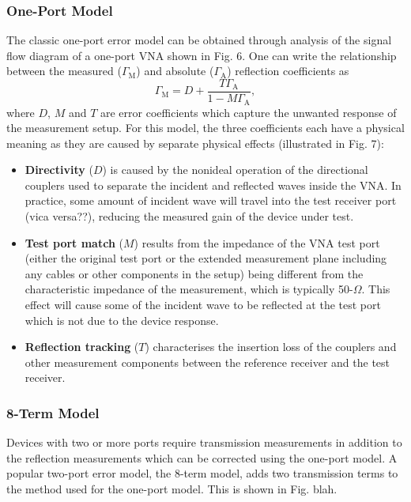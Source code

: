 \documentclass[../thesis.tex]{subfiles}
\begin{document}
\begin{refsection}
\subsubsection{One-Port Model}

The classic one-port error model can be obtained through analysis of the signal flow diagram of a one-port VNA shown in Fig. 6. One can write the relationship between the measured ($\Gamma_\textrm{M}$) and absolute ($\Gamma_\textrm{A}$) reflection coefficients as
\begin{equation}
\Gamma_\textrm{M}=D+\dfrac{T\Gamma_\textrm{A}}{1-M\Gamma_\textrm{A}},
\end{equation}
where $D$, $M$ and $T$ are error coefficients which capture the unwanted response of the measurement setup. For this model, the three coefficients each have a physical meaning as they are caused by separate physical effects (illustrated in Fig. 7):
\begin{itemize}
\item \textbf{Directivity} ($D$) is caused by the nonideal operation of the directional couplers used to separate the incident and reflected waves inside the VNA. In practice, some amount of incident wave will travel into the test receiver port (vica versa??), reducing the measured gain of the device under test.
\item \textbf{Test port match} ($M$) results from the impedance of the VNA test port (either the original test port or the extended measurement plane including any cables or other components in the setup) being different from the characteristic impedance of the measurement, which is typically 50-$\Omega$. This effect will cause some of the incident wave to be reflected at the test port which is not due to the device response.
\item \textbf{Reflection tracking} ($T$) characterises the insertion loss of the couplers and other measurement components between the reference receiver and the test receiver.
\end{itemize}

\subsubsection{8-Term Model}

Devices with two or more ports require transmission measurements in addition to the reflection measurements which can be corrected using the one-port model. A popular two-port error model, the 8-term model, adds two transmission terms to the method used for the one-port model. This is shown in Fig. blah.


\end{refsection}
\end{document}
